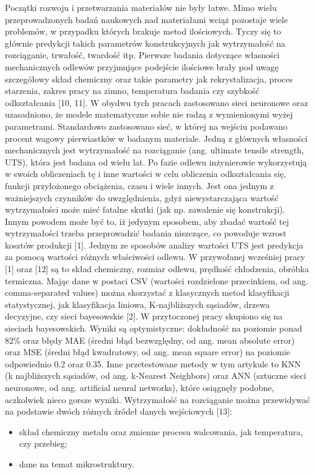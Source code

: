 Początki rozwoju i przetwarzania materiałów nie były łatwe. Mimo wielu przeprowadzonych badań naukowych nad materiałami wciąż pozostaje wiele problemów, w przypadku których brakuje metod ilościowych. Tyczy się to głównie predykcji takich parametrów konstrukcyjnych jak wytrzymałość na rozciąganie, trwałość, twardość itp. Pierwsze badania dotyczące własności mechanicznych odlewów przyjmujące podejście ilościowe brały pod uwagę szczegółowy skład chemiczny oraz takie parametry jak rekrystalizacja, proces starzenia, zakres pracy na zimno, temperatura badania czy szybkość odkształcania [10, 11]. W obydwu tych pracach zastosowano sieci neuronowe oraz uzasadniono, że modele matematyczne sobie nie radzą z wymienionymi wyżej parametrami. Standardowo zastosowano sieć, w której na wejściu podawano procent wagowy pierwiastków w badanym materiale. 
Jedną z głównych własności mechanicznych jest wytrzymałość na rozciąganie (ang. ultimate tensile strength, UTS), która jest badana od wielu lat. Po fazie odlewu inżynierowie wykorzystują w swoich obliczeniach tę i inne wartości w celu obliczenia odkształcania się, funkcji przyłożonego obciążenia, czasu i wiele innych. Jest ona jednym z ważniejszych czynników do uwzględnienia, gdyż niewystarczająca wartość wytrzymałości może mieć fatalne skutki (jak np. zawalenie się konstrukcji). Innym powodem może być to, iż jedynym sposobem, aby zbadać wartość tej wytrzymałości trzeba przeprowadzić badania niszczące, co powoduje wzrost kosztów produkcji [1]. Jednym ze sposobów analizy wartości UTS jest predykcja za pomocą wartości różnych właściwości odlewu. W przywołanej wcześniej pracy [1] oraz [12] są to skład chemiczny, rozmiar odlewu, prędkość chłodzenia, obróbka termiczna. Mając dane w postaci CSV (wartości rozdzielone przecinkiem, od ang. comma-separated values) można skorzystać z klasycznych metod klasyfikacji statystycznej, jak klasyfikacja liniowa, K-najbliższych sąsiadów, drzewa decyzyjne, czy sieci bayesowskie [2]. W przytoczonej pracy skupiono się na sieciach bayesowskich. Wyniki są optymistyczne: dokładność na poziomie ponad 82\% oraz błędy MAE (średni błąd bezwzględny, od ang. mean absolute error) oraz MSE (średni błąd kwadratowy, od ang. mean square error) na poziomie odpowiednio 0.2 oraz 0.35. Inne przetestowane metody w tym artykule to KNN (k najbliższych sąsiadów, od ang. k-Nearest Neighbors) oraz ANN (sztuczne sieci neuronowe, od ang. artificial neural networks), które osiągnęły podobne, aczkolwiek nieco gorsze wyniki. 
Wytrzymałość na rozciąganie można przewidywać na podstawie dwóch różnych źródeł danych wejściowych [13]:
\begin{itemize}
\item
skład chemiczny metalu oraz zmienne procesu walcowania, jak temperatura, czy przebieg;
\item
dane na temat mikrostruktury. 
\end{itemize} 


